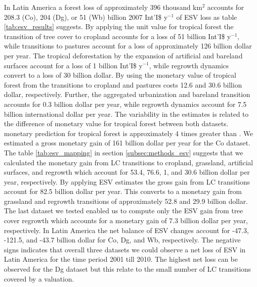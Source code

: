 		In Latin America a forest loss of approximately 396 thousand km$^2$ accounts for 208.3 (Co), 204 (Dg), or 51 (Wb) billion 2007 Int'I\$ y$^{-1}$ of \ac{ESV} loss as table \ref{tab:esv_results} suggests. By applying the \citet{Costanza2014} unit value for tropical forest the transition of tree cover to cropland accounts for a loss of 51 billion Int'I\$ y$^{-1}$, while transitions to pastures account for a loss of approximately 126 billion dollar per year. The tropical deforestation by the expansion of artificial and bareland surfaces account for a loss of 1 billion Int'I\$ y$^{-1}$, while regrowth dynamics convert to a loss of 30 billion dollar. By using the monetary value of tropical forest from \citet{Siikamaki2015} the transitions to cropland and pastures costs 12.6 and 30.6 billion dollar, respectively. Further, the aggregated urbanization and bareland transition accounts for 0.3 billion dollar per year, while regrowth dynamics account for 7.5 billion international dollar per year. The variability in the estimates is related to the difference of monetary value for tropical forest between both datasets. \citeauthor{Costanza2014} monetary prediction for tropical forest is approximately 4 times greater than \citeauthor{Siikamaki2015}. We estimated a gross monetary gain of 161 billion dollar per year for the Co dataset. The table \ref{tab:esv_mapping} in section \ref{subsec:methods_esv} suggests that we calculated the monetary gain from \ac{LC} transitions to cropland, grassland, artificial surfaces, and regrowth which account for 53.4, 76.6, 1, and 30.6 billion dollar per year, respectively. By applying \citet{Groot2012} \ac{ESV} estimates the gross gain from \ac{LC} transitions account for 82.5 billion dollar per year. This converts to a monetary gain from grassland and regrowth transitions of approximately 52.8 and 29.9 billion dollar. The last dataset we tested enabled us to compute only the \ac{ESV} gain from tree cover regrowth which accounts for a monetary gain of 7.3 billion dollar per year, respectively. In Latin America the net balance of \ac{ESV} changes account for -47.3, -121.5, and -43.7 billion dollar for Co, Dg, and Wb, respectively. The negative signs indicates that overall three datasets we could observe a net loss of \ac{ESV} in Latin America for the time period 2001 till 2010. The highest net loss can be observed for the Dg dataset but this relate to the small number of \ac{LC} transitions covered by a valuation.


